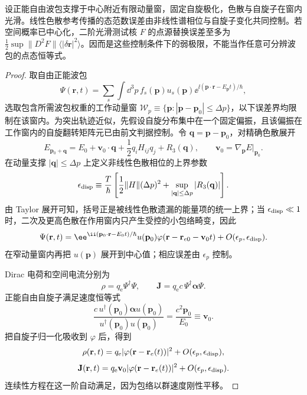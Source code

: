 \begin{proposition}[窄波包的平滑测试核控制]
设正能自由波包支撑于中心附近有限动量窗，固定自旋极化，色散与自旋子在窗内光滑。线性色散参考传播的态范数误差由非线性谱相位与自旋子变化共同控制。若空间概率已中心化，二阶光滑测试核 $F$ 的点源替换误差至多为 $\frac12\sup\|D^2F\|\langle|\delta\mathbf r|^2\rangle$。因而是这些控制条件下的弱极限，不能当作任意可分辨波包的点态恒等式。
\end{proposition}
\begin{proof}
取自由正能波包
\[
\Psi(\mathbf r,t)
=
\sum_s\int\dd^3p\,
f_s(\mathbf p)u_s(\mathbf p)
\ee^{\ii(\mathbf p\cdot\mathbf r-E_{\mathbf p}t)/\hbar},
\]
选取包含所需波包权重的工作动量窗 $\mathcal W_p\equiv\{\mathbf p:|\mathbf p-\mathbf p_0|\le\Delta p\}$，以下误差界均限制在该窗内。为突出轨迹近似，先假设自旋分布集中在一个固定偏振，且该偏振在工作窗内的自旋翻转矩阵元已由前文判据控制。令 $\mathbf q=\mathbf p-\mathbf p_0$，对精确色散展开
\[
E_{\mathbf p_0+\mathbf q}
=E_0+\mathbf v_0\cdot\mathbf q
+\frac12 q_iH_{ij}q_j+R_3(\mathbf q),
\qquad
\mathbf v_0=\nabla_{\mathbf p}E|_{\mathbf p_0}.
\]
在动量支撑 $|\mathbf q|\le\Delta p$ 上定义非线性色散相位的上界参数
\[
\epsilon_{\rm disp}
\equiv
\frac{T}{\hbar}
\left[
\frac12\|H\|(\Delta p)^2
+\sup_{|\mathbf q|\le\Delta p}|R_3(\mathbf q)|
\right].
\]
由 Taylor 展开可知，括号正是被线性色散遗漏的能量项的统一上界；当 $\epsilon_{\rm disp}\ll1$ 时，二次及更高色散在作用窗内只产生受控的小包络畸变，因此
\[
\Psi(\mathbf r,t)
=
\ee^{\ii(\mathbf p_0\cdot\mathbf r-E_0t)/\hbar}
 u(\mathbf p_0)
\varphi(\mathbf r-\mathbf r_{e0}-\mathbf v_0t)
+O(\epsilon_p,\epsilon_{\rm disp}).
\]
在窄动量窗内再把 $u(\mathbf p)$ 展开到中心值；相应误差由 $\epsilon_p$ 控制。

Dirac 电荷和空间电流分别为
\[
\rho=q_{\mathrm e}\Psi^\dagger\Psi,
\qquad
\mathbf J=q_{\mathrm e} c\,\Psi^\dagger\boldsymbol\alpha\Psi.
\]
正能自由自旋子满足速度恒等式
\[
\frac{c\,u^\dagger(\mathbf p_0)\boldsymbol\alpha u(\mathbf p_0)}
{u^\dagger(\mathbf p_0)u(\mathbf p_0)}
=
\frac{c^2\mathbf p_0}{E_0}
\equiv\mathbf v_0.
\]
把自旋子归一化吸收到 $\varphi$ 后，得到
\[
\rho(\mathbf r,t)
=q_{\mathrm e}|\varphi(\mathbf r-\mathbf r_e(t))|^2
+O(\epsilon_p,\epsilon_{\rm disp}),
\]
\[
\mathbf J(\mathbf r,t)
=q_{\mathrm e}\mathbf v_0|\varphi(\mathbf r-\mathbf r_e(t))|^2
+O(\epsilon_p,\epsilon_{\rm disp}).
\]
连续性方程在这一阶自动满足，因为包络以群速度刚性平移。


\end{proof}
